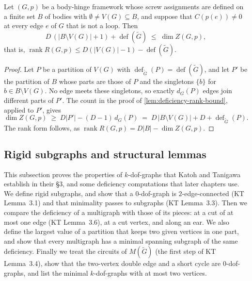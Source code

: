 \begin{lemma}
  \label{lem:relative-deficiency-rank-bound}
  \leanok
  Let $(G,p)$ be a body-hinge framework whose screw assignments are
  defined on a finite set $B$ of bodies with
  $\emptyset \neq V(G) \subseteq B$, and suppose that $C(p(e)) \neq 0$
  at every edge $e$ of $G$ that is not a loop. Then
  \[
    D\,(|B \setminus V(G)| + 1) + \operatorname{def}(\tilde G) \;\le\;
      \dim Z(G,p),
  \]
  that is,
  $\operatorname{rank} R(G,p) \le D(|V(G)| - 1) - \operatorname{def}(\tilde G)$.
\end{lemma}
\begin{proof}
  \leanok
  Let $P$ be a partition of $V(G)$ with
  $\operatorname{def}_{\tilde G}(P) = \operatorname{def}(\tilde G)$, and
  let $P'$ be the partition of $B$ whose parts are those of $P$ and the
  singletons $\{b\}$ for $b \in B \setminus V(G)$. No edge meets these
  singletons, so exactly $d_G(P)$ edges join different parts of $P'$.
  The count in the proof of \cref{lem:deficiency-rank-bound},
  applied to $P'$, gives
  \[
    \dim Z(G,p) \;\ge\; D|P'| - (D-1)\,d_G(P) \;=\;
    D\,|B \setminus V(G)| + D + \operatorname{def}_{\tilde G}(P).
  \]
  The rank form follows, as
  $\operatorname{rank} R(G,p) = D|B| - \dim Z(G,p)$.
\end{proof}

\subsection{Rigid subgraphs and structural lemmas}
\label{sec:molecular-deficiency-rigid}

This subsection proves the properties of $k$-dof-graphs that Katoh and
Tanigawa establish in their \S3, and some deficiency computations that
later chapters use. We define rigid subgraphs, and show that a
$0$-dof-graph is $2$-edge-connected (KT Lemma~3.1) and that minimality
passes to subgraphs (KT Lemma~3.3). Then we compare the deficiency of a
multigraph with those of its pieces: at a cut of at most one edge (KT
Lemma~3.6), at a cut vertex, and along an ear. We also define the
largest value of a partition that keeps two given vertices in one part,
and show that every multigraph has a minimal spanning subgraph of the
same deficiency. Finally we treat the circuits of $M(\tilde G)$ (the
first step of KT Lemma~3.4), show that the two-vertex double edge and a
short cycle are $0$-dof-graphs, and list the minimal $k$-dof-graphs
with at most two vertices.

